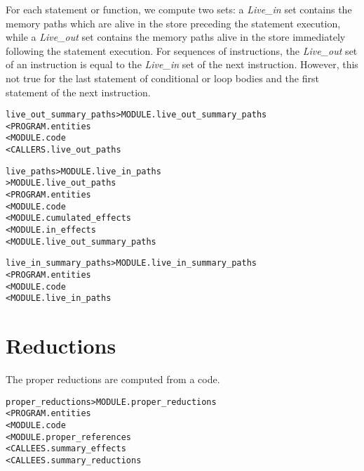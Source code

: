 \documentclass[a4paper]{report}
\newenvironment{PipsMake}{\begin{alltt}}{\end{alltt}}
\newenvironment{PipsPass}[1]{\label{pass:#1}}{}
\begin{document}
For each statement or function, we compute two sets: a \emph{Live\_in}
set contains the memory paths which are alive in the store preceding
the statement execution, while a \emph{Live\_out} set contains the
memory paths alive in the store immediately following the statement
execution. For sequences of instructions, the \emph{Live\_out} set of
an instruction is equal to the \emph{Live\_in} set of the next
instruction. However, this not true for the last statement of
conditional or loop bodies and the first statement of the next
instruction.

\begin{PipsPass}{live_out_summary_paths}
\end{PipsPass}

\begin{PipsMake}
live_out_summary_paths     > MODULE.live_out_summary_paths
        < PROGRAM.entities
        < MODULE.code
        < CALLERS.live_out_paths
\end{PipsMake}


\begin{PipsPass}{live_paths}
\end{PipsPass}

\begin{PipsMake}
live_paths     > MODULE.live_in_paths
               > MODULE.live_out_paths
        < PROGRAM.entities
        < MODULE.code
        < MODULE.cumulated_effects
        < MODULE.in_effects
        < MODULE.live_out_summary_paths
\end{PipsMake}

\begin{PipsPass}{live_summary_paths}
\end{PipsPass}


\begin{PipsMake}
live_in_summary_paths     > MODULE.live_in_summary_paths
        < PROGRAM.entities
        < MODULE.code
        < MODULE.live_in_paths
\end{PipsMake}



\section{Reductions}
\label{sec:reductions}

The proper reductions are computed from a code.

\begin{PipsMake}
proper_reductions > MODULE.proper_reductions
  < PROGRAM.entities
  < MODULE.code
  < MODULE.proper_references
  < CALLEES.summary_effects
  < CALLEES.summary_reductions
\end{PipsMake}
\end{document}
